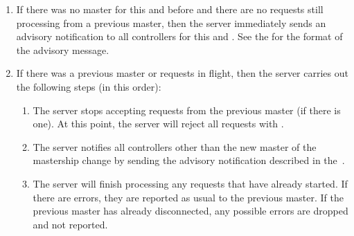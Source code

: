 \documentclass[11pt]{article}
\begin{document}
{\begin{enumerate}
\begin{enumerate}%

\item{}
If there was no master for this  and  before and
there are no  requests still processing from a previous master,
then the server immediately sends an advisory notification to all
controllers for this  and . See the
 for the format of the
advisory message.%

\item{}
If there was a previous master or  requests in flight, then the
server carries out the following steps (in this order):%

\begin{enumerate}%

\item{}
The server stops accepting  requests from the previous master
(if there is one). At this point, the server will reject all 
requests with .%

\item{}
The server notifies all controllers other than the new master of the
mastership change by sending the advisory notification described in
the~.%

\item{}
The server will finish processing any  requests that have
already started. If there are errors, they are reported as usual to
the previous master. If the previous master has already disconnected,
any possible errors are dropped and not reported.%


\end{enumerate}
\end{enumerate}
\end{enumerate}}
\end{document}
